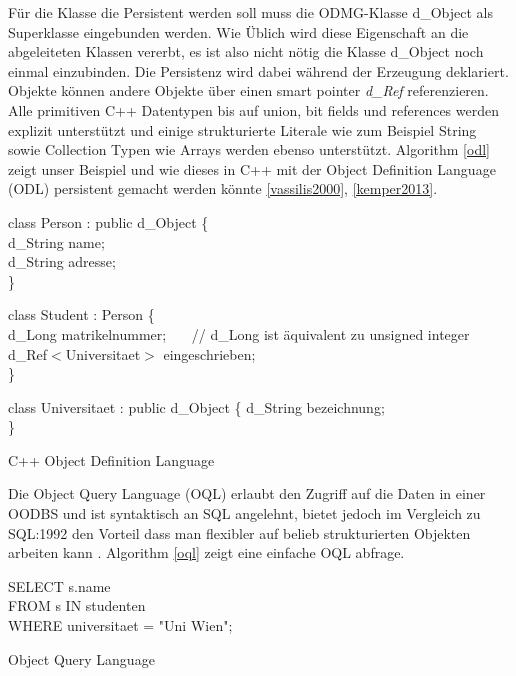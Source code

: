 Für die Klasse die Persistent werden soll muss die ODMG-Klasse d\_Object als Superklasse eingebunden werden. Wie Üblich wird diese Eigenschaft an die abgeleiteten Klassen vererbt, es ist also nicht nötig die Klasse d\_Object noch einmal einzubinden. Die Persistenz wird dabei während der Erzeugung deklariert. Objekte können andere Objekte über einen smart pointer \emph{d\_Ref} referenzieren. Alle primitiven C++ Datentypen bis auf union, bit fields und references werden explizit unterstützt und einige strukturierte Literale wie zum Beispiel String sowie Collection Typen wie Arrays werden ebenso unterstützt. Algorithm \ref{odl} zeigt unser Beispiel und wie dieses in C++ mit der Object Definition Language (ODL) persistent gemacht werden könnte \ref{vassilis2000}, \ref{kemper2013}.

\vspace{.3cm}
\begin{algorithm}[H]
	class Person : public d\_Object \{ \\
		\Indp
		d\_String name; \\
		d\_String adresse; \\
		\Indm
	\}

	class Student : Person \{ \\
		\Indp
		d\_Long matrikelnummer;  ~~~// d\_Long ist äquivalent zu unsigned integer \\
		d\_Ref\(<\)Universitaet\(>\) eingeschrieben; \\
		\Indm
	\}

	class Universitaet : public d\_Object \{
		\Indp
		d\_String bezeichnung; \\
		\Indm
	\}
	\caption{C++ Object Definition Language}
	\label{odl}
\end{algorithm}
\vspace{.3cm}

Die Object Query Language (OQL) erlaubt den Zugriff auf die Daten in einer OODBS und ist syntaktisch an SQL angelehnt, bietet jedoch im Vergleich zu SQL:1992 den Vorteil dass man flexibler auf belieb strukturierten Objekten arbeiten kann \cite{kemper2013}. Algorithm \ref{oql} zeigt eine einfache OQL abfrage.

\vspace{.3cm}
\begin{algorithm}[H]
	SELECT s.name \\
	FROM s IN studenten \\
	WHERE universitaet = "{}Uni Wien"{};
	\caption{Object Query Language}
	\label{oql}	
\end{algorithm}
\vspace{.3cm}


